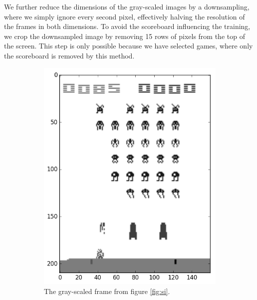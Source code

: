 \documentclass[11pt]{article}
\begin{document}
We further reduce the dimensions of the gray-scaled images by a downsampling, where
we simply ignore every second pixel, effectively halving the resolution of the frames 
in both dimensions.
To avoid the scoreboard influencing the training, we crop the downsampled image by removing
15 rows of pixels from the top of the screen.
This step is only possible because we have selected games, where only the scoreboard is
removed by this method.
\begin{figure}[h!]
    \begin{subfigure}[t]{.5\textwidth}
        \centering
        \includegraphics[scale=0.35]{include/space_invaders_1_gray.png}
        \caption{The gray-scaled frame from figure \ref{fig:si}.}
        \label{fig:sig}
    \end{subfigure}
    \begin{subfigure}[t]{.5\textwidth}
        \centering

\end{subfigure}
\end{figure}
\end{document}
